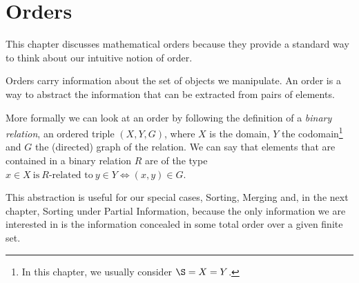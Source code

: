 \section{Orders}

This chapter discusses mathematical orders because they provide a standard
way to think about our intuitive notion of order.

Orders carry information about the set of objects we manipulate. An order is a
way to abstract the information that can be extracted from pairs of elements.

More formally we can look at an order by following the definition of a \emph{binary
relation}, \ie an ordered triple $(X, Y, G)$, where $X$ is the domain, $Y$ the
codomain\footnote{
In this chapter, we usually consider \(\S = X = Y\).
}
and $G$ the (directed) graph of the relation.
We can say that elements that are contained in a binary relation $R$ are
of the type $x \in X~\text{is}~R\text{-related to}~y \in Y \iff (x, y) \in G$.

This abstraction is useful for our special cases, \ie Sorting, Merging and, in
the next chapter, Sorting under Partial Information, because the only
information we are interested in is the information concealed in some total
order over a given finite set.

